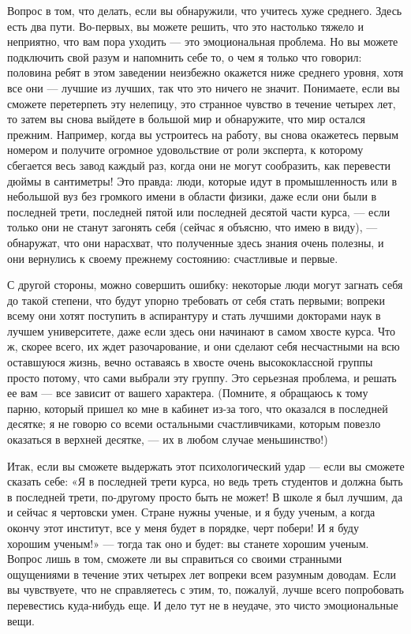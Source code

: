 \documentclass[11pt,oneside]{article}
\begin{document}
Вопрос в том, что делать, если вы обнаружили, что учитесь хуже среднего. Здесь есть два пути. Во-первых, вы можете решить, что это настолько тяжело и неприятно, что вам пора уходить --- это эмоциональная проблема. Но вы можете подключить свой разум и напомнить себе то, о чем я только что говорил: половина ребят в этом заведении неизбежно окажется ниже среднего уровня, хотя все они --- лучшие из лучших, так что это ничего не значит. Понимаете, если вы сможете перетерпеть эту нелепицу, это странное чувство в течение четырех лет, то затем вы снова выйдете в большой мир и обнаружите, что мир остался прежним. Например, когда вы устроитесь на работу, вы снова окажетесь первым номером и получите огромное удовольствие от роли эксперта, к которому сбегается весь завод каждый раз, когда они не могут сообразить, как перевести дюймы в сантиметры! Это правда: люди, которые идут в промышленность или в небольшой вуз без громкого имени в области физики, даже если они были в последней трети, последней пятой или последней десятой части курса, --- если только они не станут загонять себя (сейчас я объясню, что имею в виду), --- обнаружат, что они нарасхват, что полученные здесь знания очень полезны, и они вернулись к своему прежнему состоянию: счастливые и первые.\par

С другой стороны, можно совершить ошибку: некоторые люди могут загнать себя до такой степени, что будут упорно требовать от себя стать первыми; вопреки всему они хотят поступить в аспирантуру и стать лучшими докторами наук в лучшем университете, даже если здесь они начинают в самом хвосте курса. Что ж, скорее всего, их ждет разочарование, и они сделают себя несчастными на всю оставшуюся жизнь, вечно оставаясь в хвосте очень высококлассной группы просто потому, что сами выбрали эту группу. Это серьезная проблема, и решать ее вам --- все зависит от вашего характера. (Помните, я обращаюсь к тому парню, который пришел ко мне в кабинет из-за того, что оказался в последней десятке; я не говорю со всеми остальными счастливчиками, которым повезло оказаться в верхней десятке, --- их в любом случае меньшинство!)\par

Итак, если вы сможете выдержать этот психологический удар --- если вы сможете сказать себе: «Я в последней трети курса, но ведь треть студентов и должна быть в последней трети, по-другому просто быть не может! В школе я был лучшим, да и сейчас я чертовски умен. Стране нужны ученые, и я буду ученым, а когда окончу этот институт, все у меня будет в порядке, черт побери! И я буду хорошим ученым!» --- тогда так оно и будет: вы станете хорошим ученым. Вопрос лишь в том, сможете ли вы справиться со своими странными ощущениями в течение этих четырех лет вопреки всем разумным доводам. Если вы чувствуете, что не справляетесь с этим, то, пожалуй, лучше всего попробовать перевестись куда-нибудь еще. И дело тут не в неудаче, это чисто эмоциональные вещи.\par
\end{document}
